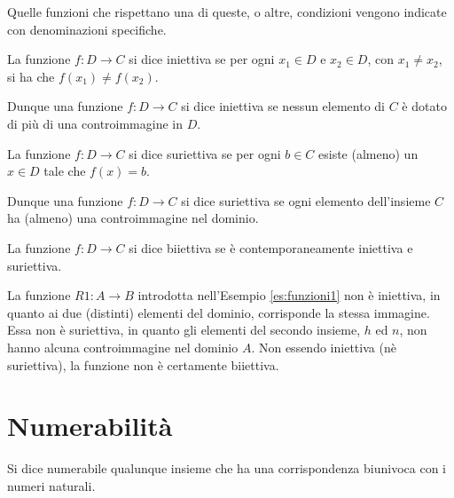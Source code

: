 Quelle funzioni che rispettano una di queste, o altre, condizioni vengono indicate con denominazioni specifiche.
\begin{definition}[Iniettiva]
    La funzione $f: D\rightarrow C$ si dice iniettiva se per ogni $x_1\in D$ e $x_2\in D$, con $x_1\neq x_2$, si ha che $f(x_1)\neq f (x_2)$.
    
    Dunque una funzione $f: D\rightarrow C$ si dice iniettiva se nessun elemento di $C$ è dotato di più di una controimmagine in $D$.
\end{definition}

\begin{definition}[Surriettiva]
    La funzione $f: D\rightarrow C$ si dice suriettiva se per ogni $b\in C$ esiste (almeno) un $x\in D$ tale che $f(x) = b$.
    
    Dunque una funzione $f: D\rightarrow C$ si dice suriettiva se ogni elemento dell’insieme $C$ ha (almeno) una controimmagine nel dominio.
\end{definition}

\begin{definition}[Biiettiva]
    La funzione $f: D\rightarrow C$ si dice biiettiva se è contemporaneamente iniettiva e suriettiva.
\end{definition}

\begin{example}
    La funzione $R1: A\rightarrow B$ introdotta nell’Esempio \ref{es:funzioni1} non è iniettiva, in quanto ai due (distinti) elementi del dominio, corrisponde la stessa immagine. 
    Essa non è suriettiva, in quanto gli elementi del secondo insieme, $h$ ed $n$, non hanno alcuna controimmagine nel dominio $A$. 
    Non essendo iniettiva (nè suriettiva), la funzione non è certamente biiettiva.
\end{example}

\section{Numerabilità}
\begin{definition}[Numerabilità]
    Si dice numerabile qualunque insieme che ha una corrispondenza biunivoca con i numeri naturali.
\end{definition}

